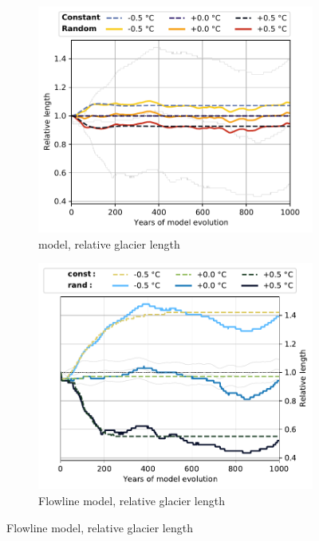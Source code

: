 \begin{figure}[p]
          \begin{subfigure}[b]{0.476\textwidth}
            \caption{\Vas{} model, relative glacier length}
            \label{fig:hintereisferner:length_vas}
            \centering
            \includegraphics[width=\textwidth]{../plots/final_plots/time_series/single_glaciers/length_norm_vas_Hintereisferner.pdf}
          \end{subfigure}
          \hfill
          \begin{subfigure}[b]{0.476\textwidth}
            \caption{Flowline model, relative glacier length}
            \label{fig:hintereisferner:length_fl}
            \centering
            \includegraphics[width=\textwidth]{../plots/final_plots/time_series/single_glaciers/length_norm_fl_Hintereisferner.pdf}
          \end{subfigure}
          

\end{figure}
